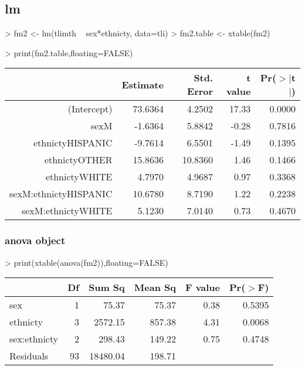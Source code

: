 \documentclass[letterpaper]{article}
\begin{document}
\subsection{lm}
\begin{Schunk}
\begin{Sinput}
> fm2 <- lm(tlimth ~ sex*ethnicty, data=tli)
> fm2.table <- xtable(fm2)
\end{Sinput}
\end{Schunk}
\begin{Schunk}
\begin{Sinput}
> print(fm2.table,floating=FALSE)
\end{Sinput}
% latex table generated in R 3.1.1 by xtable 1.7-3 package
% 
\begin{tabular}{rrrrr}
  \hline
 & Estimate & Std. Error & t value & Pr($>$$|$t$|$) \\ 
  \hline
(Intercept) & 73.6364 & 4.2502 & 17.33 & 0.0000 \\ 
  sexM & -1.6364 & 5.8842 & -0.28 & 0.7816 \\ 
  ethnictyHISPANIC & -9.7614 & 6.5501 & -1.49 & 0.1395 \\ 
  ethnictyOTHER & 15.8636 & 10.8360 & 1.46 & 0.1466 \\ 
  ethnictyWHITE & 4.7970 & 4.9687 & 0.97 & 0.3368 \\ 
  sexM:ethnictyHISPANIC & 10.6780 & 8.7190 & 1.22 & 0.2238 \\ 
  sexM:ethnictyWHITE & 5.1230 & 7.0140 & 0.73 & 0.4670 \\ 
   \hline
\end{tabular}\end{Schunk}
\subsubsection{anova object}

\begin{Schunk}
\begin{Sinput}
> print(xtable(anova(fm2)),floating=FALSE)
\end{Sinput}
% latex table generated in R 3.1.1 by xtable 1.7-3 package
% 
\begin{tabular}{lrrrrr}
  \hline
 & Df & Sum Sq & Mean Sq & F value & Pr($>$F) \\ 
  \hline
sex & 1 & 75.37 & 75.37 & 0.38 & 0.5395 \\ 
  ethnicty & 3 & 2572.15 & 857.38 & 4.31 & 0.0068 \\ 
  sex:ethnicty & 2 & 298.43 & 149.22 & 0.75 & 0.4748 \\ 
  Residuals & 93 & 18480.04 & 198.71 &  &  \\ 
   \hline
\end{tabular}\end{Schunk}
\end{document}
